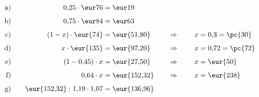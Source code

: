 \begin{exercise}
      \newcommand{\eqBB}{\noeq}
      \newcommand{\eqBC}{\noeq}
      \newcommand{\eqCA}{(1-x)\cdot\text{\eur{74}}&=\text{\eur{51,80}}}
      \newcommand{\eqCB}{\quad&\Rightarrow\quad}
      \newcommand{\eqCC}{x&=0,\!3=\text{\pc{30}}}
      \newcommand{\eqDA}{x\cdot\text{\eur{135}}&=\text{\eur{97,20}}}
      \newcommand{\eqDB}{\quad&\Rightarrow\quad}
      \newcommand{\eqDC}{x&=0,\!72=\text{\pc{72}}}
      \newcommand{\eqEA}{(1-0,\!45)\cdot x&=\text{\eur{27,50}}}
      \newcommand{\eqEB}{\quad&\Rightarrow\quad}
      \newcommand{\eqEC}{x&=\text{\eur{50}}}
      \newcommand{\eqFA}{0,\!64\cdot x&=\text{\eur{152,32}}}
      \newcommand{\eqFB}{\quad&\Rightarrow\quad}
      \newcommand{\eqFC}{x&=\text{\eur{238}}}
      \newcommand{\eqGA}{\text{\eur{152,32}}:1,\!19\cdot1,\!07&=\text{\eur{136,96}}}
      \newcommand{\eqGB}{\noeq}
      \newcommand{\eqGC}{\noeq}
      \setlength{\abovedisplayskip}{0pt}%
      \begin{alignat*}{4}
        \text{a)}&\quad & \eqAA & \eqAB & \eqAC \\[1ex]
        \text{b)}&\quad & \eqBA & \eqBB & \eqBC \\[1ex]
        \text{c)}&\quad & \eqCA & \eqCB & \eqCC \\[1ex]
        \text{d)}&\quad & \eqDA & \eqDB & \eqDC \\[1ex]
        \text{e)}&\quad & \eqEA & \eqEB & \eqEC \\[1ex]
        \text{f)}&\quad & \eqFA & \eqFB & \eqFC \\[1ex]
        \text{g)}&\quad & \eqGA & \eqGB & \eqGC
      \end{alignat*}
    \endgroup
  \fi
\end{exercise}
